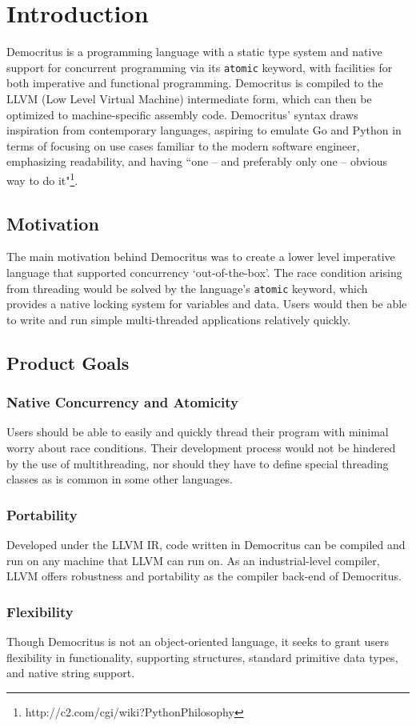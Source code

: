 \chapter{Introduction}

Democritus is a programming language with a static type system and native support for concurrent programming via its \texttt{atomic} keyword, with facilities for both imperative and functional programming. Democritus is compiled to the LLVM (Low Level Virtual Machine) intermediate form, which can then be optimized to machine-specific assembly code. Democritus' syntax draws inspiration from contemporary languages, aspiring to emulate Go and Python in terms of focusing on use cases familiar to the modern software engineer, emphasizing readability, and having ``one -- and preferably only one -- obvious way to do it"\footnote[1]{http://c2.com/cgi/wiki?PythonPhilosophy}.


\section{Motivation}

The main motivation behind Democritus was to create a lower level imperative language that supported concurrency `out-of-the-box'. The race condition arising from threading would be solved by the language's \texttt{atomic} keyword, which provides a native locking system for variables and data. Users would then be able to write and run simple multi-threaded applications relatively quickly. 

\section{Product Goals}

	\subsection{Native Concurrency and Atomicity}
		Users should be able to easily and quickly thread their program with minimal worry about race conditions. Their development process would not be hindered by the use of multithreading, nor should they have to define special threading classes as is common in some other languages.

	\subsection{Portability}
		Developed under the LLVM IR, code written in Democritus can be compiled and run on any machine that LLVM can run on. As an industrial-level compiler, LLVM offers robustness and portability as the compiler back-end of Democritus. 

	\subsection{Flexibility}
		Though Democritus is not an object-oriented language, it seeks to grant users flexibility in functionality, supporting structures, standard primitive data types, and native string support.
